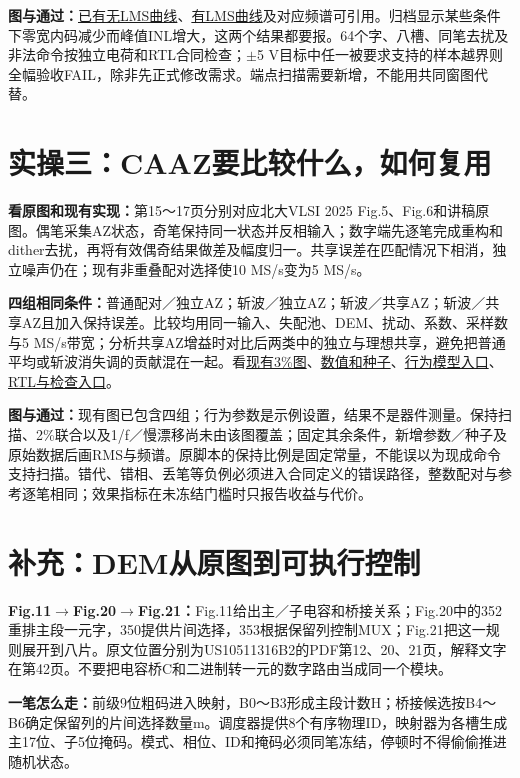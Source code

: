 \documentclass[zihao=5,a4paper,fontset=none]{ctexart}
\begin{document}
\textbf{图与通过：}\href{../task2/evidence/eight_negative/eight_native_no_lms_linearity.png}{已有无LMS曲线}、\href{../task2/evidence/eight_negative/eight_native_linearity.png}{有LMS曲线}及对应频谱可引用。归档显示某些条件下零宽内码减少而峰值INL增大，这两个结果都要报。64个字、八槽、同笔去扰及非法命令按独立电荷和RTL合同检查；$\pm$5 V目标中任一被要求支持的样本越界则全幅验收FAIL，除非先正式修改需求。端点扫描需要新增，不能用共同窗图代替。


\clearpage
\section{实操三：CAAZ要比较什么，如何复用}

\textbf{看原图和现有实现：}第15～17页分别对应北大VLSI 2025 Fig.5、Fig.6和讲稿原图。偶笔采集AZ状态，奇笔保持同一状态并反相输入；数字端先逐笔完成重构和dither去扰，再将有效偶奇结果做差及幅度归一。共享误差在匹配情况下相消，独立噪声仍在；现有非重叠配对选择使10 MS/s变为5 MS/s。

\textbf{四组相同条件：}普通配对／独立AZ；斩波／独立AZ；斩波／共享AZ；斩波／共享AZ且加入保持误差。比较均用同一输入、失配池、DEM、扰动、系数、采样数与5 MS/s带宽；分析共享AZ增益时对比后两类中的独立与理想共享，避免把普通平均或斩波消失调的贡献混在一起。看\href{../task3/evidence/negative/joint_noise/caaz_joint_noise.png}{现有3\%图}、\href{../task3/evidence/negative/joint_noise/summary.json}{数值和种子}、\href{../task3/tools/run_joint_noise.py}{行为模型入口}、\href{../task3/README.md}{RTL与检查入口}。

\textbf{图与通过：}现有图已包含四组；行为参数是示例设置，结果不是器件测量。保持扫描、2\%联合以及1/f／慢漂移尚未由该图覆盖；固定其余条件，新增参数／种子及原始数据后画RMS与频谱。原脚本的保持比例是固定常量，不能误以为现成命令支持扫描。错代、错相、丢笔等负例必须进入合同定义的错误路径，整数配对与参考逐笔相同；效果指标在未冻结门槛时只报告收益与代价。


\clearpage
\section{补充：DEM从原图到可执行控制}

\textbf{Fig.11$\to$Fig.20$\to$Fig.21：}Fig.11给出主／子电容和桥接关系；Fig.20中的352重排主段一元字，350提供片间选择，353根据保留列控制MUX；Fig.21把这一规则展开到八片。原文位置分别为US10511316B2的PDF第12、20、21页，解释文字在第42页。不要把电容桥C和二进制转一元的数字路由当成同一个模块。

\textbf{一笔怎么走：}前级9位粗码进入映射，B0～B3形成主段计数H；桥接候选按B4～B6确定保留列的片间选择数量m。调度器提供8个有序物理ID，映射器为各槽生成主17位、子5位掩码。模式、相位、ID和掩码必须同笔冻结，停顿时不得偷偷推进随机状态。
\end{document}
